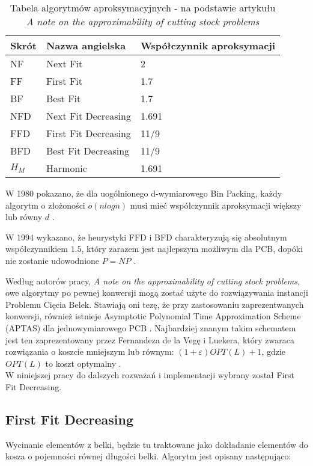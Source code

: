 \begin{table}[!h] 
\begin{center}
	\begin{tabular}{ |p{3cm}|p{5cm}|p{3cm}|  }
		\hline
		Skrót & Nazwa angielska & Współczynnik aproksymacji\\
		\hline
		NF   & Next Fit & 2\\
		FF & First Fit & 1.7\\
		BF & Best Fit & 1.7\\
		NFD & Next Fit Decreasing &  1.691\\
		FFD & First Fit Decreasing & 11/9\\
		BFD & Best Fit Decreasing & 11/9\\
		$H_M$ & Harmonic & 1.691\\	
		\hline
	\end{tabular}
	\caption{\label{APPROX_RATIOS}Tabela algorytmów aproksymacyjnych - na podstawie artykułu \textit{A note on the approximability of cutting stock problems} }
\end{center}
\end{table}

W 1980 pokazano, że dla uogólnionego d-wymiarowego Bin Packing, każdy algorytm o złożoności $o(nlogn)$ musi mieć współczynnik aproksymacji większy lub równy $d$ \cite{APPROX_RATIO}.

W 1994 wykazano, że heurystyki FFD i BFD charakteryzują się absolutnym współczynnikiem $1.5$, który zarazem jest najlepszym możliwym dla PCB, dopóki nie zostanie udowodnione $P=NP$ \cite{WORST_CASE_APPROX}.

Według autorów pracy, \textit{A note on the approximability of cutting stock problems}, owe algorytmy po pewnej konwersji mogą zostać użyte do rozwiązywania instancji Problemu Cięcia Belek. Stawiają oni tezę, że przy zastosowaniu zaprezentwanych konwersji, również istnieje Asymptotic Polynomial Time Approximation Scheme (APTAS) dla jednowymiarowego PCB \cite{NOTE_ON_APPROX}.
Najbardziej znanym takim schematem jest ten zaprezentowany przez Fernandeza de la Vegę i Luekera, który zwaraca rozwiązania o koszcie mniejszym lub równym: $(1+\varepsilon)OPT(L) + 1$, gdzie $OPT(L)$ to koszt optymalny \cite{APTAS}. \\

W niniejszej pracy do dalszych rozważań i implementacji wybrany został First Fit Decreasing.

\subsection{First Fit Decreasing}  \label{approx_pseudocode}
Wycinanie elementów z belki, będzie tu traktowane jako dokładanie elementów do kosza o pojemności równej długości belki.
Algorytm jest opisany następująco:



